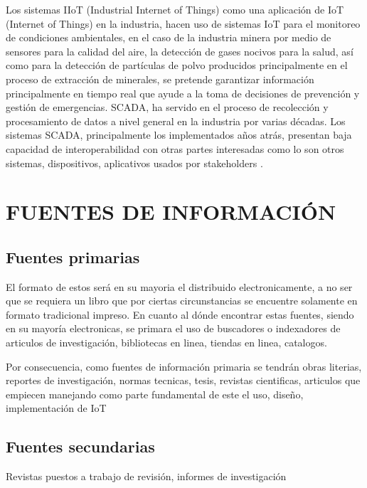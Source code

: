 \documentclass[stu,12pt,floatsintext]{apa7}
\begin{document}
	Los sistemas IIoT (Industrial Internet of Things) como una aplicación de IoT (Internet of Things) en la industria, hacen uso de sistemas IoT para el monitoreo de condiciones ambientales, en el caso de la industria minera por medio de sensores para la calidad del aire, la detección de gases nocivos para la salud, así como para la detección de partículas de polvo producidos principalmente en el proceso de extracción de minerales, se pretende garantizar información principalmente en tiempo real que ayude a la toma de decisiones de prevención y gestión de emergencias\cite{reference-1}.
	SCADA, ha servido en el proceso de recolección y procesamiento de datos a nivel general en la industria por varias décadas. Los sistemas SCADA, principalmente los implementados años atrás, presentan baja capacidad de interoperabilidad con otras partes interesadas como lo son otros sistemas, dispositivos, aplicativos usados por stakeholders \cite{SCADA_UMaT}.
	
	\section{FUENTES DE INFORMACIÓN}
	\subsection{Fuentes primarias}
	El formato de estos será en su mayoria el distribuido electronicamente, a no ser que se requiera un libro que por ciertas circunstancias se encuentre solamente en formato tradicional impreso. En cuanto al dónde encontrar estas fuentes, siendo en su mayoría electronicas, se primara el uso de buscadores o indexadores de articulos de investigación, bibliotecas en linea, tiendas en linea, catalogos.
	
	Por consecuencia, como fuentes de información primaria se tendrán obras literias, reportes de investigación, normas tecnicas, tesis, revistas cientificas,  articulos que empiecen manejando como parte fundamental de este el uso, diseño, implementación de IoT
	\subsection{Fuentes secundarias}
	Revistas puestos a trabajo de revisión, informes de investigación
\end{document}
